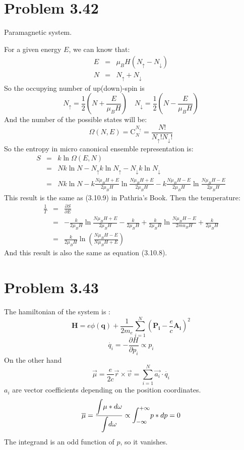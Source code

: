 \documentclass{article}
\begin{document}
\section*{Problem 3.42}
	Paramagnetic system.

	For a given energy $E$, we can know that:
	\begin{eqnarray}
	E &=& \mu_B H (N_{\uparrow}-N_\downarrow)\\
	N &=& N_\uparrow + N_\downarrow
	\end{eqnarray}
	So the occupying number of up(down)-spin is
	$$
	N_\uparrow = \frac{1}{2}\left(N+\frac{E}{\mu_B H}\right)\quad N_\downarrow = \frac{1}{2}\left(N-\frac{E}{\mu_B H}\right)
	$$
	And the number of the possible states will be:
	\begin{equation}
	\Omega(N,E) = \mathrm{C}_{N}^{N_\uparrow}=\frac{N!}{N_\uparrow !N_\downarrow!}
	\end{equation}
	So the entropy in micro canonical ensemble representation is:
	\begin{eqnarray}
	S &=& k\ln\Omega(E,N) \nonumber\\
	&=& Nk\ln N -N_\uparrow k \ln N_\uparrow - N_\downarrow k \ln N_\downarrow\nonumber\\
	&=& Nk\ln N -k\frac{N\mu_B H +E}{2\mu_B H}\ln \frac{N\mu_B H +E}{2\mu_B H}-k\frac{N\mu_B H -E}{2\mu_B H}\ln\frac{N\mu_B H -E}{2\mu_B H}
	\end{eqnarray}
	This result is the same as (3.10.9) in Pathria's Book. Then the temperature:
	\begin{eqnarray}
	\frac{1}{T} &=& \frac{\partial S}{\partial E}\nonumber\\
	&=&-\frac{k}{2\mu_B H}\ln \frac{N\mu_B H +E}{2\mu_B H}-\frac{k}{2\mu_B H}+\frac{k}{2\mu_BH}\ln\frac{N\mu_B H-E}{2
	mu_B H}+\frac{k}{2\mu_BH}\nonumber\\
	&=&\frac{k}{2\mu_BH}\ln\left(\frac{N\mu_BH-E}{N\mu_BH+E}\right)
	\end{eqnarray}
	And this result is also the same as equation (3.10.8).


\section*{Problem 3.43} %
\label{sec:problem_3_43}
	The hamiltonian of the system is :
	$$\boldsymbol{H}=e\phi (\boldsymbol{q})+\frac{1}{2m_e}\sum_{i=1}^{N}(\boldsymbol{P_i}-\frac{e}{c}\boldsymbol{A_i})^2$$
	$$\dot{q_i}=-\frac{\partial{H}}{\partial{p_i}}\propto p_i$$
	On the other hand
	$$\vec\mu=\frac{e}{2c}\vec{r}\times\vec{v}=\sum_{i=1}^{N}\vec{a_i}\cdot \dot{q_i}$$
	$a_i$ are vector coefficients depending on the position coordinates.
	$$\overline\mu=\frac{\mathlarger{\int}\mu*d\omega}{\mathlarger{\int}d\omega}\propto\mathlarger{\int_{ - \infty }^{ + \infty }}p*dp=0$$
	The integrand is an odd function of $p$, so it vanishes.
\end{document}
